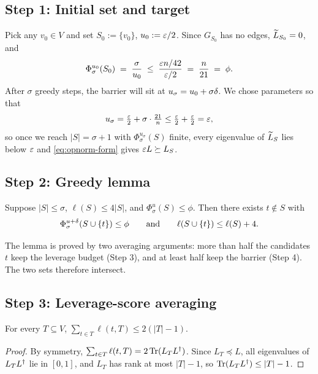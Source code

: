 \documentclass[11pt]{article}
\begin{document}
\subsection*{Step 1: Initial set and target}

Pick any $v_0\in V$ and set $S_0:=\{v_0\}$, $u_0:=\varepsilon/2$. Since $G_{S_0}$ has
no edges, $\widetilde{L}_{S_0}=0$, and
\[
  \Phi^{u_0}_\sigma(S_0) \;=\; \frac{\sigma}{u_0}
   \;\le\; \frac{\varepsilon n/42}{\varepsilon/2} \;=\; \frac{n}{21} \;=\; \phi.
\]
After $\sigma$ greedy steps, the barrier will sit at $u_\sigma=u_0+\sigma\delta$.
We chose parameters so that
\[
  u_\sigma = \tfrac{\varepsilon}{2} + \sigma\cdot\tfrac{21}{n}
           \le \tfrac{\varepsilon}{2} + \tfrac{\varepsilon}{2} = \varepsilon,
\]
so once we reach $|S|=\sigma+1$ with $\Phi^{u_\sigma}_\sigma(S)$ finite, every
eigenvalue of $\widetilde{L}_S$ lies below $\varepsilon$ and \eqref{eq:opnorm-form} gives
$\varepsilon L\succeq L_S$.

\subsection*{Step 2: Greedy lemma}

\begin{qsixlemma}\label{lem:greedy}
Suppose $|S|\le\sigma$, $\ell(S)\le 4|S|$, and $\Phi^u_\sigma(S)\le\phi$. Then
there exists $t\notin S$ with
\[
  \Phi^{u+\delta}_\sigma(S\cup\{t\})\le\phi
  \qquad\text{and}\qquad
  \ell(S\cup\{t\})\le\ell(S)+4.
\]
\end{qsixlemma}

\noindent The lemma is proved by two averaging arguments: more than half the
candidates $t$ keep the leverage budget (Step 3), and at least half keep the
barrier (Step 4). The two sets therefore intersect.

\subsection*{Step 3: Leverage-score averaging}

\begin{qsixclaim}\label{cl:Tlev}
For every $T\subseteq V$, $\sum_{t\in T}\ell(t,T)\le 2(|T|-1)$.
\end{qsixclaim}
\begin{proof}
By symmetry, $\sum_{t\in T}\ell(t,T)=2\operatorname{Tr}(L_TL^{\dagger})$. Since $L_T\preceq L$, all
eigenvalues of $L_TL^{\dagger}$ lie in $[0,1]$, and $L_T$ has rank at most $|T|-1$, so
$\operatorname{Tr}(L_TL^{\dagger})\le|T|-1$.
\end{proof}
\end{document}

